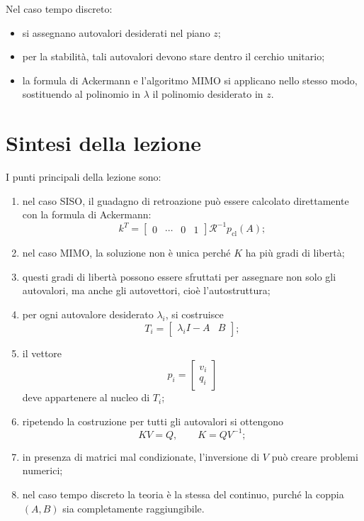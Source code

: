 Nel caso tempo discreto:
\begin{itemize}
    \item si assegnano autovalori desiderati nel piano \(z\);
    \item per la stabilità, tali autovalori devono stare dentro il cerchio unitario;
    \item la formula di Ackermann e l'algoritmo MIMO si applicano nello stesso modo,
    sostituendo al polinomio in \(\lambda\) il polinomio desiderato in \(z\).
\end{itemize}

\section{Sintesi della lezione}

I punti principali della lezione sono:
\begin{enumerate}
    \item nel caso SISO, il guadagno di retroazione può essere calcolato direttamente con la formula di Ackermann:
    \[
    k^T=
    \begin{bmatrix}
    0 & \cdots & 0 & 1
    \end{bmatrix}
    \mathcal{R}^{-1}p_{\text{cl}}(A);
    \]

    \item nel caso MIMO, la soluzione non è unica perché \(K\) ha più gradi di libertà;

    \item questi gradi di libertà possono essere sfruttati per assegnare non solo gli autovalori,
    ma anche gli autovettori, cioè l'autostruttura;

    \item per ogni autovalore desiderato \(\lambda_i\), si costruisce
    \[
    T_i=
    \begin{bmatrix}
    \lambda_i I-A & B
    \end{bmatrix};
    \]

    \item il vettore
    \[
    p_i=
    \begin{bmatrix}
    v_i\\
    q_i
    \end{bmatrix}
    \]
    deve appartenere al nucleo di \(T_i\);

    \item ripetendo la costruzione per tutti gli autovalori si ottengono
    \[
    KV=Q,
    \qquad
    K=QV^{-1};
    \]

    \item in presenza di matrici mal condizionate, l'inversione di \(V\) può creare problemi numerici;

    \item nel caso tempo discreto la teoria è la stessa del continuo, purché la coppia \((A,B)\) sia completamente raggiungibile.
\end{enumerate}